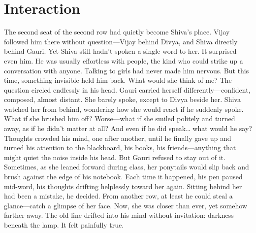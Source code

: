 \chapter{Interaction}
The second seat of the second row had quietly become Shiva's place. Vijay followed him there without question—Vijay behind Divya, and Shiva directly behind Gauri. Yet Shiva still hadn't spoken a single word to her. It surprised even him. He was usually effortless with people, the kind who could strike up a conversation with anyone. Talking to girls had never made him nervous. But this time, something invisible held him back. What would she think of me? The question circled endlessly in his head. Gauri carried herself differently—confident, composed, almost distant. She barely spoke, except to Divya beside her. Shiva watched her from behind, wondering how she would react if he suddenly spoke. What if she brushed him off? Worse—what if she smiled politely and turned away, as if he didn't matter at all? And even if he did speak… what would he say? Thoughts crowded his mind, one after another, until he finally gave up and turned his attention to the blackboard, his books, his friends—anything that might quiet the noise inside his head. But Gauri refused to stay out of it. Sometimes, as she leaned forward during class, her ponytails would slip back and brush against the edge of his notebook. Each time it happened, his pen paused mid-word, his thoughts drifting helplessly toward her again. Sitting behind her had been a mistake, he decided. From another row, at least he could steal a glance—catch a glimpse of her face. Now, she was closer than ever, yet somehow farther away. The old line drifted into his mind without invitation: darkness beneath the lamp. It felt painfully true.


